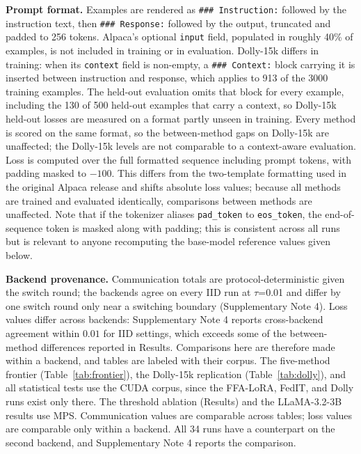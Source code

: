 \documentclass[pdflatex,sn-nature,lineno]{sn-jnl}
\begin{document}
\textbf{Prompt format.} Examples are rendered as \texttt{\#\#\# Instruction:} followed by the instruction text, then \texttt{\#\#\# Response:} followed by the output, truncated and padded to 256 tokens. Alpaca's optional \texttt{input} field, populated in roughly 40\% of examples, is not included in training or in evaluation. Dolly-15k differs in training: when its \texttt{context} field is non-empty, a \texttt{\#\#\# Context:} block carrying it is inserted between instruction and response, which applies to 913 of the 3000 training examples. The held-out evaluation omits that block for every example, including the 130 of 500 held-out examples that carry a context, so Dolly-15k held-out losses are measured on a format partly unseen in training. Every method is scored on the same format, so the between-method gaps on Dolly-15k are unaffected; the Dolly-15k levels are not comparable to a context-aware evaluation. Loss is computed over the full formatted sequence including prompt tokens, with padding masked to $-100$. This differs from the two-template formatting used in the original Alpaca release and shifts absolute loss values; because all methods are trained and evaluated identically, comparisons between methods are unaffected. Note that if the tokenizer aliases \texttt{pad\_token} to \texttt{eos\_token}, the end-of-sequence token is masked along with padding; this is consistent across all runs but is relevant to anyone recomputing the base-model reference values given below.

\textbf{Backend provenance.} Communication totals are protocol-deterministic given the switch round; the backends agree on every IID run at $\tau$=0.01 and differ by one switch round only near a switching boundary (Supplementary Note 4). Loss values differ across backends: Supplementary Note 4 reports cross-backend agreement within $0.01$ for IID settings, which exceeds some of the between-method differences reported in Results. Comparisons here are therefore made within a backend, and tables are labeled with their corpus. The five-method frontier (Table~\ref{tab:frontier}), the Dolly-15k replication (Table~\ref{tab:dolly}), and all statistical tests use the CUDA corpus, since the FFA-LoRA, FedIT, and Dolly runs exist only there. The threshold ablation (Results) and the LLaMA-3.2-3B results use MPS. Communication values are comparable across tables; loss values are comparable only within a backend. All 34 runs have a counterpart on the second backend, and Supplementary Note 4 reports the comparison.
\end{document}
